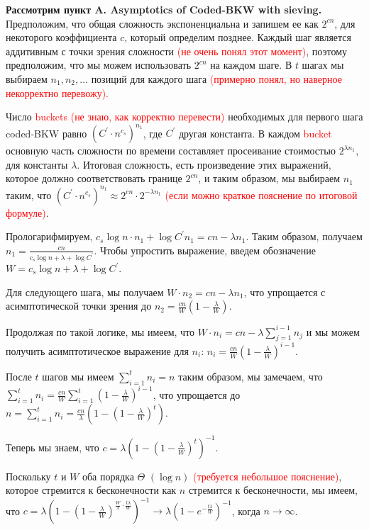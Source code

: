 \documentclass[a4paper,11pt]{article}
\begin{document}
\textbf{Рассмотрим пункт A. Asymptotics of Coded-BKW with sieving.}\\

Предположим, что общая сложность экспоненциальна и запишем ее как $2^{cn}$, для некоторого коэффициента $c$, который определим позднее. Каждый шаг является аддитивным с точки зрения сложности \textcolor{red}{(не очень понял этот момент)}, поэтому предположим, что мы можем использовать $2^{cn}$ на каждом шаге. В $t$ шагах мы выбираем $n_1,n_2,…$ позиций для каждого шага  \textcolor{red}{(примерно понял, но наверное некорректно перевожу).}

Число \textcolor{red}{buckets (не знаю, как корректно перевести)} необходимых для первого шага coded-BKW равно $(C^{'} \cdot n^{c_s})^{n_1}$, где $C^{'}$ другая константа. В каждом \textcolor{red}{bucket} основную часть сложности по времени составляет просеивание стоимостью $2^{\lambda n_1}$, для константы $\lambda$. Итоговая сложность, есть произведение этих выражений, которое должно соответствовать границе $2^{cn}$, и таким образом, мы выбираем $n_1$ таким, что $(C^{'} \cdot n^{c_s})^{n_1} \approx 2^{cn} \cdot 2^{- \lambda n_1}$ \textcolor{red}{(если можно краткое пояснение по итоговой формуле)}.

Прологарифмируем, $c_s \log{n} \cdot n_1 + \log{C^{'}} n_1 = cn - \lambda n_1$. Таким образом, получаем $n_1 = \frac{cn}{c_s \log{n} + \lambda + \log{C^{'}}}$. Чтобы упростить выражение, введем обозначение $W=c_s \log{n} + \lambda + \log{C^{'}}$.

Для следующего шага, мы получаем $W \cdot n_2 = cn - \lambda n_1$, что упрощается с асимптотической точки зрения до $n_2 = \frac{cn}{W} (1 - \frac{\lambda}{W})$.

Продолжая по такой логике, мы имеем, что $W \cdot n_i = cn - \lambda \sum_{j=1}^{i-1}  n_j$ и мы можем получить асимптотическое выражение для $n_i$: $n_i = \frac{cn}{W} (1 - \frac{\lambda}{W})^{i-1}$.

После $t$ шагов мы имеем $\sum_{i=1}^t n_i = n$ таким образом, мы замечаем, что $\sum_{i=1}^t n_i = \frac{cn}{W} \sum_{i=1}^t (1 - \frac{\lambda}{W})^{i-1}$, что упрощается до $n = \sum_{i=1}^t n_i = \frac{cn}{\lambda} (1-(1-\frac{\lambda}{W})^t)$.

Теперь мы знаем, что $c=\lambda (1-(1-\frac{\lambda}{W})^t)^{-1}$.

Поскольку $t$ и $W$ оба порядка $\Theta$ $(\log{n})$  \textcolor{red}{(требуется небольшое пояснение)}, которое стремится к бесконечности как $n$ стремится к бесконечности, мы имеем, что $c=\lambda (1-(1-\frac{\lambda}{W})^{\frac{W}{\lambda} \cdot \frac{t \lambda}{W}})^{-1} \rightarrow \lambda (1-e^{- \frac{t \lambda}{W}})^{-1}$, когда $n \rightarrow \infty$.
\end{document}
